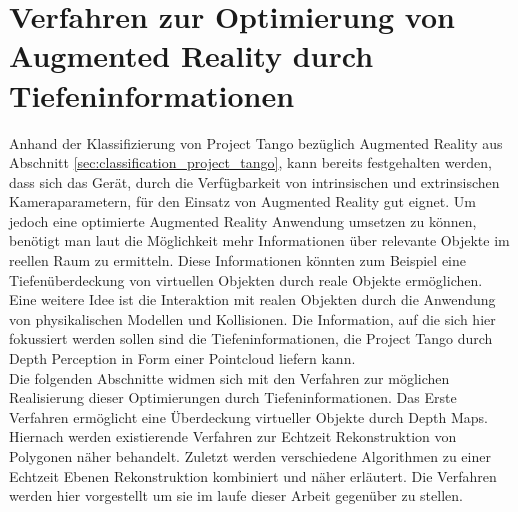 \chapter{Verfahren zur Optimierung von Augmented Reality durch Tiefeninformationen}

Anhand der Klassifizierung von Project Tango bezüglich Augmented Reality aus Abschnitt \ref{sec:classification_project_tango}, kann bereits festgehalten werden, dass sich das Gerät, durch die Verfügbarkeit von intrinsischen und extrinsischen Kameraparametern, für den Einsatz von Augmented Reality gut eignet. Um jedoch eine optimierte Augmented Reality Anwendung umsetzen zu können, benötigt man laut \citet{azuma2001recent} die Möglichkeit mehr Informationen über relevante Objekte im reellen Raum zu ermitteln. Diese Informationen könnten zum Beispiel eine Tiefenüberdeckung von virtuellen Objekten durch reale Objekte ermöglichen. Eine weitere Idee ist die Interaktion mit realen Objekten durch die Anwendung von physikalischen Modellen und Kollisionen. Die Information, auf die sich hier fokussiert werden sollen sind die Tiefeninformationen, die Project Tango durch Depth Perception in Form einer Pointcloud liefern kann.\\

Die folgenden Abschnitte widmen sich mit den Verfahren zur möglichen Realisierung dieser Optimierungen durch Tiefeninformationen. Das Erste Verfahren ermöglicht eine Überdeckung virtueller Objekte durch Depth Maps. Hiernach werden existierende Verfahren zur Echtzeit Rekonstruktion von Polygonen näher behandelt. Zuletzt werden verschiedene Algorithmen zu einer Echtzeit Ebenen Rekonstruktion kombiniert und näher erläutert. Die Verfahren werden hier vorgestellt um sie im laufe dieser Arbeit gegenüber zu stellen.\\






